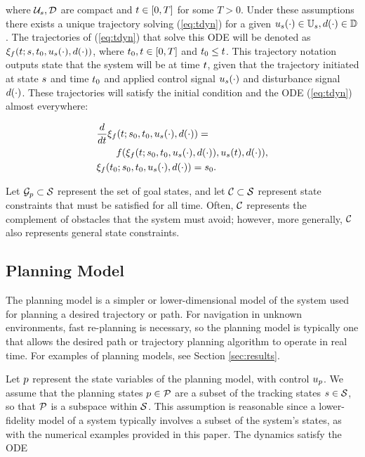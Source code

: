 \noindent where $\mathcal{U}_s, \mathcal{D}$ are compact and $t\in[0, T]$ for some $T>0$. Under these assumptions there exists a unique trajectory solving (\ref{eq:tdyn}) for a given $u_s(\cdot) \in \mathbb{U}_s, d(\cdot)\in\mathbb{D}$ \cite{Coddington84}. The trajectories of (\ref{eq:tdyn}) that solve this ODE will be denoted as $\xi_{f}(t; s, t_0, u_s(\cdot), d(\cdot))$, where $t_0,t \in [0, T]$ and $t_0 \leq t$. This trajectory notation outputs state that the system will be at time $t$, given that the trajectory initiated at state $s$ and time $t_0$ and applied control signal $u_s(\cdot)$ and disturbance signal $d(\cdot)$.  These trajectories will satisfy the initial condition and the ODE (\ref{eq:tdyn}) almost everywhere:

\begin{align*}
&\frac{d}{dt}\xi_{f}(t; s_0, t_0, u_s(\cdot), d(\cdot)) = \\ &\qquad f(\xi_{f}(t; s_0, t_0, u_s(\cdot), d(\cdot)), u_s(t), d(\cdot)), \\
&\xi_{f}(t_0; s_0, t_0, u_s(\cdot), d(\cdot)) = s_0.
\end{align*}

Let $\mathcal G_p \subset \mathcal{S}$ represent the set of goal states, and let $\mathcal C \subset \mathcal{S}$ represent state constraints that must be satisfied for all time.
Often, $\mathcal C$ represents the complement of obstacles that the system must avoid; however, more generally, $\mathcal C$ also represents general state constraints.

\subsection{Planning Model \label{sec:planning_model}}
The planning model is a simpler or lower-dimensional model of the system used for planning a desired trajectory or path.
For navigation in unknown environments, fast re-planning is necessary, so the planning model is typically one that allows the desired path or trajectory planning algorithm to operate in real time.
For examples of planning models, see Section \ref{sec:results}.

Let $p$ represent the state variables of the planning model, with control $u_p$. 
We assume that the planning states $p \in \mathcal{P}$ are a subset of the tracking states $s \in \mathcal{S}$, so that $\mathcal{P}$ is a subspace within $\mathcal{S}$.
This assumption is reasonable since a lower-fidelity model of a system typically involves a subset of the system's states, as with the numerical examples provided in this paper.
The dynamics satisfy the ODE


